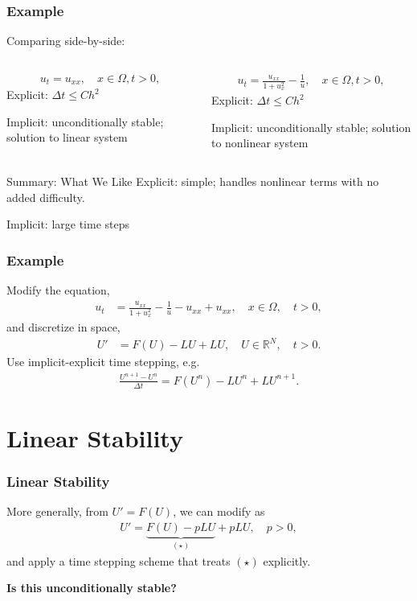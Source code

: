 \documentclass[hyperref={pdfpagelabels=false}]{beamer}
\begin{document}
\begin{frame}
	\frametitle{Example}
Comparing side-by-side:
	\begin{columns}
\begin{column}{0.48\textwidth}
	\begin{align*} 
		u_t = u_{xx}, \quad x\in \Omega, t > 0,
	\end{align*}
Explicit: $\Delta t \leq Ch^2$

Implicit: unconditionally stable; solution to linear system
\end{column}
\begin{column}{0.48\textwidth}
	\begin{align*} 
		u_t = \frac{u_{xx}}{1 + u_x^2} - \frac{1}{u}, \quad x\in \Omega, t > 0,
	\end{align*}
Explicit: $\Delta t \leq Ch^2$

Implicit: unconditionally stable; solution to nonlinear system
\end{column}
	\end{columns}
	\begin{alertblock}{Summary: What We Like}
		Explicit: simple; handles nonlinear terms with no added difficulty.

		Implicit: large time steps
	\end{alertblock}
\end{frame}

\begin{frame}
	\frametitle{Example}
Modify the equation,
	\begin{align*}
		u_t &= \frac{u_{xx}}{1 + u_x^2} - \frac{1}{u} - u_{xx} + u_{xx}, \quad x\in \Omega, \quad t>0, 
	\end{align*}
and discretize in space,
	\begin{align*}
		U' &= F(U) - LU + LU, \quad U\in \mathbb{R}^N,\quad t > 0.
	\end{align*}
Use implicit-explicit time stepping, e.g.
	\begin{align*}
		\frac{U^{n+1} - U^n}{\Delta t} = F(U^n) - LU^n + LU^{n+1}.
	\end{align*}
\end{frame}

\section{Linear Stability} 
\begin{frame}
	\frametitle{Linear Stability}
More generally, from $U'=F(U)$, we can modify as 
	\begin{align*}
 		U' = \underbrace{F(U) - pLU}_{(\star)} + pLU, \quad p > 0,
	\end{align*}
and apply a time stepping scheme that treats $(\star)$ explicitly.

\vspace{5pt}
\textbf{Is this unconditionally stable?}
\end{frame}
\end{document}
